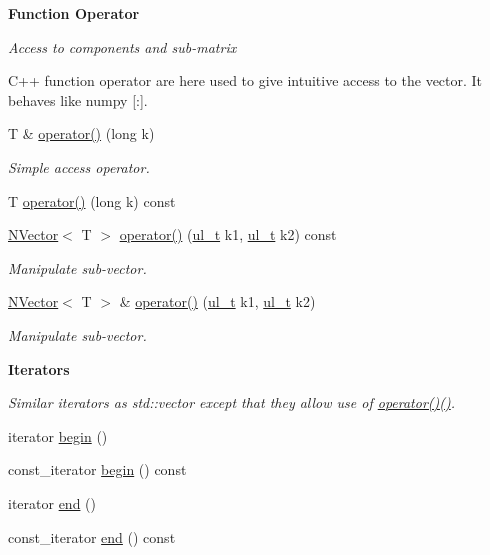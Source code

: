 \begin{Indent}\textbf{ Function Operator}\par
{\em Access to components and sub-\/matrix

C++ function operator are here used to give intuitive access to the vector. It behaves like numpy {\ttfamily \mbox{[}\+:\mbox{]}}. }\begin{DoxyCompactItemize}
\item 
T \& \mbox{\hyperlink{class_n_vector_a3ed21b63fd97af9c63bfacb372f733a5}{operator()}} (long k)
\begin{DoxyCompactList}\small\item\em Simple access operator. \end{DoxyCompactList}\item 
T \mbox{\hyperlink{class_n_vector_a51d4a2c505c1434f45e8f80d1d77eda5}{operator()}} (long k) const
\item 
\mbox{\hyperlink{class_n_vector}{N\+Vector}}$<$ T $>$ \mbox{\hyperlink{class_n_vector_a8778fdc3c0a27a7930fda3f2a7155e96}{operator()}} (\mbox{\hyperlink{typedef_8h_a1b140a2034db3f5dfe18a987745df43a}{ul\+\_\+t}} k1, \mbox{\hyperlink{typedef_8h_a1b140a2034db3f5dfe18a987745df43a}{ul\+\_\+t}} k2) const
\begin{DoxyCompactList}\small\item\em Manipulate sub-\/vector. \end{DoxyCompactList}\item 
\mbox{\hyperlink{class_n_vector}{N\+Vector}}$<$ T $>$ \& \mbox{\hyperlink{class_n_vector_a98f95a46c34ceaf355e86e9dad9863e1}{operator()}} (\mbox{\hyperlink{typedef_8h_a1b140a2034db3f5dfe18a987745df43a}{ul\+\_\+t}} k1, \mbox{\hyperlink{typedef_8h_a1b140a2034db3f5dfe18a987745df43a}{ul\+\_\+t}} k2)
\begin{DoxyCompactList}\small\item\em Manipulate sub-\/vector. \end{DoxyCompactList}\end{DoxyCompactItemize}
\end{Indent}
\begin{Indent}\textbf{ Iterators}\par
{\em Similar iterators as {\ttfamily std\+::vector} except that they allow use of {\ttfamily \mbox{\hyperlink{class_n_vector_a3ed21b63fd97af9c63bfacb372f733a5}{operator()()}}}. }\begin{DoxyCompactItemize}
\item 
iterator \mbox{\hyperlink{class_n_vector_ae71ea78f955c0512a1dd005c335f956a}{begin}} ()
\item 
const\+\_\+iterator \mbox{\hyperlink{class_n_vector_a39aa7aecfd17e2db8130f5fbc956bb8f}{begin}} () const
\item 
iterator \mbox{\hyperlink{class_n_vector_a11675cb00213e89ae5a563f59d0f4ff3}{end}} ()
\item 
const\+\_\+iterator \mbox{\hyperlink{class_n_vector_ac019e1018e5d0dd8113d2f2605aa2987}{end}} () const
\end{DoxyCompactItemize}
\end{Indent}
